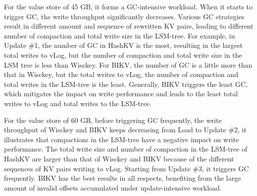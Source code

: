 \documentclass[sigconf]{acmart}
\begin{document}
For the value store of 45 GB, it forms a GC-intensive workload. When it starts to trigger GC, the write throughput significantly decreases. Various GC strategies result in different amount and sequence of rewritten KV pairs, leading to different number of compaction and total write size in the LSM-tree. For example, in Update \#1, the number of GC in HashKV is the most, resulting in the largest total writes to vLog, but the number of compaction and total write size in the LSM tree is less than Wisckey. For BIKV, the number of GC is a little more than that in Wisckey, but the total writes to vLog, the number of compaction and total writes in the LSM-tree is the least. Generally, BIKV triggers the least GC, which mitigates the impact on write performance and leads to the least total writes to vLog and total writes to the LSM-tree.

For the value store of 60 GB, before triggering GC frequently, the write throughput of Wisckey and BIKV keeps decreasing from Load to Update \#2, it illustrates that compactions in the LSM-tree have a negative impact on write performance. The total write size and number of compaction in the LSM-tree of HashKV are larger than that of Wisckey and BIKV because of the different sequences of KV pairs writing to vLog. Starting from Update \#3, it triggers GC frequently. BIKV has the best results in all respects, benefiting from the large amount of invalid offsets accumulated under update-intensive workload.
\end{document}
